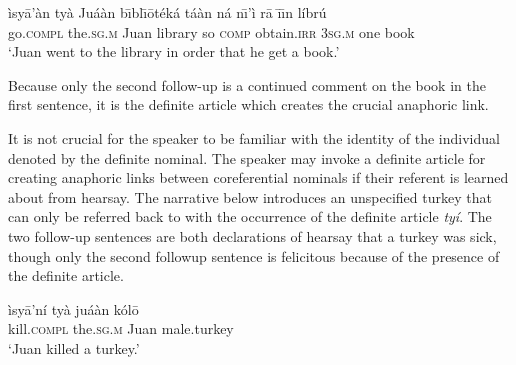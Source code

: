 \documentclass[output=paper,modfonts,nonflat]{langsci/langscibook}
\begin{document}
\ea {}\label{ex:cisneros:66}
\gll
\`isy\=a'\`an {\ob}ty\`a Ju\'a\`an{\cb} b\=\i bl\=\i \=ot\'ek\'a t\'a\`an n\'a n\=\i'\`i r\=a {\ob}\=\i\=\i n l\'ibr\'u{\cb}\\
go.\textsc{compl} {\db}the.\textsc{sg.m} Juan library so \textsc{comp} obtain.\textsc{irr} 3\textsc{sg.m} {\db}one book\\
\glt
`Juan went to the library in order that he get a book.'


\z 
\z

Because only the second follow-up is a continued comment on the book in the first sentence, it is the definite article which creates the crucial anaphoric link.

It is not crucial for the speaker to be familiar with the identity of the individual denoted by the definite nominal.  The speaker may invoke a definite article for creating anaphoric links between coreferential nominals if their referent is learned about from hearsay.  The narrative below introduces an unspecified turkey that can only be referred back to with the occurrence of the definite article \textit{ty\'i}.  The two follow-up sentences are both declarations of hearsay that a turkey was sick, though only the second followup sentence is felicitous because of the presence of the definite article.

\ea {}\label{ex:cisneros:67}
\gll
\`isy\=a'n\'i {\ob}ty\`a ju\'a\`an{\db} k\'ol\=o\\
kill.\textsc{compl} {\db}the.\textsc{sg.m} Juan male.turkey\\
\glt
`Juan killed a turkey.'

\end{document}
